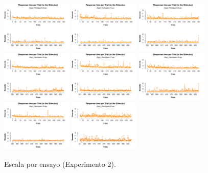 \begin{figure}[th]
\includegraphics[width=0.30\textwidth]{Figures/RT1_Exp2_P13} \includegraphics[width=0.30\textwidth]{Figures/RT1_Exp2_P14} \includegraphics[width=0.30\textwidth]{Figures/RT1_Exp2_P15}
\includegraphics[width=0.30\textwidth]{Figures/RT1_Exp2_P16} \includegraphics[width=0.30\textwidth]{Figures/RT1_Exp2_P17} \includegraphics[width=0.30\textwidth]{Figures/RT1_Exp2_P18}
\includegraphics[width=0.30\textwidth]{Figures/RT1_Exp2_P19} \includegraphics[width=0.30\textwidth]{Figures/RT1_Exp2_P20} 
\caption[Rating_Exp2]{Escala por ensayo (Experimento 2).}
\label{fig:Rating_E2}
\end{figure}


